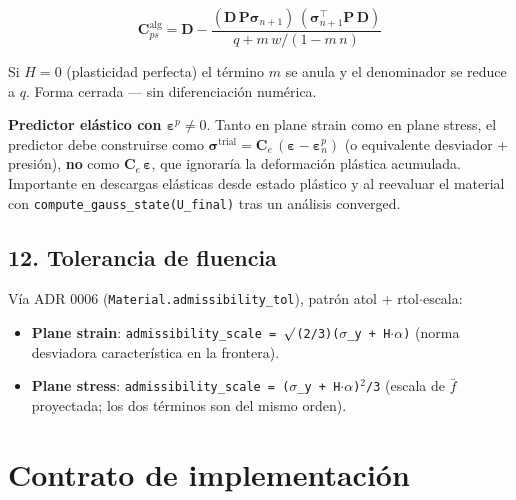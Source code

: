 \documentclass[11pt,letterpaper,oneside]{report}
\begin{document}
\[
\mathbf C^{\text{alg}}_{ps} = \mathbf D - \frac{(\mathbf D\,\mathbf P\boldsymbol\sigma_{n+1})\,(\boldsymbol\sigma_{n+1}^\top\mathbf P\,\mathbf D)}{q + m\,w / (1 - m\,n)}
\]

Si $H=0$ (plasticidad perfecta) el término $m$ se anula y el denominador se reduce a $q$. Forma cerrada --- sin diferenciación numérica.

\textbf{Predictor elástico con $\boldsymbol\varepsilon^p \neq 0$}. Tanto en plane strain como en plane stress, el predictor debe construirse como $\boldsymbol\sigma^{\text{trial}} = \mathbf C_e\,(\boldsymbol\varepsilon - \boldsymbol\varepsilon^p_n)$ (o equivalente desviador + presión), \textbf{no} como $\mathbf C_e\,\boldsymbol\varepsilon$, que ignoraría la deformación plástica acumulada. Importante en descargas elásticas desde estado plástico y al reevaluar el material con \texttt{compute\_gauss\_state(U\_final)} tras un análisis converged.

\subsection{12. Tolerancia de fluencia}

Vía ADR 0006 (\texttt{Material.admissibility\_tol}), patrón atol + rtol\ensuremath{\cdot}escala:

\begin{itemize}
  \item \textbf{Plane strain}: \texttt{admissibility\_scale = \ensuremath{\surd}(2/3)(\ensuremath{\sigma}\_y + H\ensuremath{\cdot}\ensuremath{\alpha})} (norma desviadora característica en la frontera).
  \item \textbf{Plane stress}: \texttt{admissibility\_scale = (\ensuremath{\sigma}\_y + H\ensuremath{\cdot}\ensuremath{\alpha})\ensuremath{^{2}}/3} (escala de $\bar f$ proyectada; los dos términos son del mismo orden).
\end{itemize}


\section{Contrato de implementación}
\end{document}
